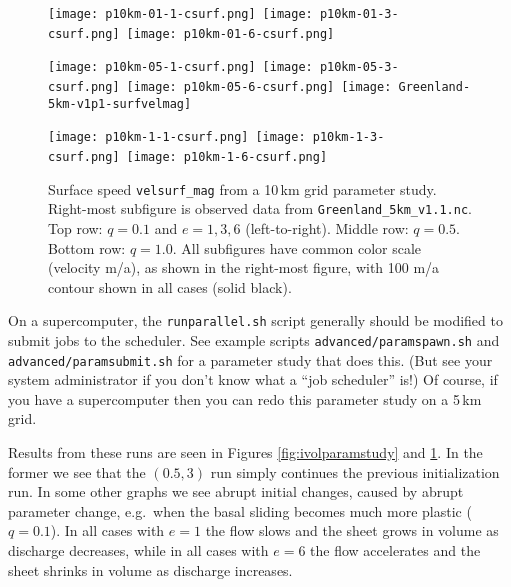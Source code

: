 \begin{figure}[ht]
\centering
\mbox{\texttt{[image: p10km-01-1-csurf.png]} \texttt{[image: p10km-01-3-csurf.png]} \texttt{[image: p10km-01-6-csurf.png]} \qquad \hspace{1.81in}}

\mbox{\texttt{[image: p10km-05-1-csurf.png]} \texttt{[image: p10km-05-3-csurf.png]} \texttt{[image: p10km-05-6-csurf.png]} 
\texttt{[image: Greenland-5km-v1p1-surfvelmag]}}
\smallskip

\mbox{\texttt{[image: p10km-1-1-csurf.png]} \texttt{[image: p10km-1-3-csurf.png]} \texttt{[image: p10km-1-6-csurf.png]} \qquad \hspace{1.81in}}

\caption{Surface speed \texttt{velsurf_mag} from a 10\,km grid parameter study.  Right-most subfigure is observed data from \texttt{Greenland_5km_v1.1.nc}.  Top row: $q=0.1$ and $e=1,3,6$ (left-to-right).  Middle row: $q=0.5$.  Bottom row: $q=1.0$.  All subfigures have common color scale (velocity m/a), as shown in the right-most figure, with 100 m/a contour shown in all cases (solid black).}
\label{fig:paramstudy}
\end{figure}

On a supercomputer, the \texttt{runparallel.sh} script generally should be modified to submit jobs to the scheduler.  See example scripts \texttt{advanced/paramspawn.sh} and \texttt{advanced/paramsubmit.sh} for a parameter study that does this.  (But see your system administrator if you don't know what a ``job scheduler'' is!)  Of course, if you have a supercomputer then you can redo this parameter study on a 5\,km grid.

Results from these runs are seen in Figures \ref{fig:ivolparamstudy} and \ref{fig:paramstudy}.  In the former we see that the $(0.5,3)$ run simply continues the previous initialization run.  In some other graphs we see abrupt initial changes, caused by abrupt parameter change, e.g.~when the basal sliding becomes much more plastic ($q=0.1$).  In all cases with $e=1$ the flow slows and the sheet grows in volume as discharge decreases, while in all cases with $e=6$ the flow accelerates and the sheet shrinks in volume as discharge increases.

